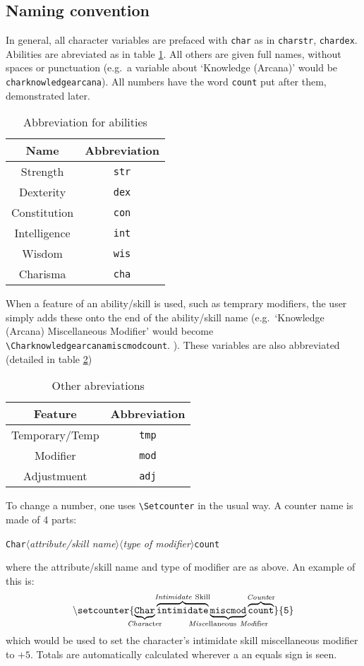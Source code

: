 \documentclass[oneside]{article}
\begin{document}
\subsection{Naming convention}
\label{sec:naming-convention}

In general, all character variables are prefaced with \verb=char= as in \verb=charstr=, \verb=chardex=. Abilities are abreviated as in table \ref{tab:abbrev}. All others are given full names, without spaces or punctuation (e.g.\ a variable about `Knowledge (Arcana)' would be \verb=charknowledgearcana=). All numbers have the word \verb=count= put after them, demonstrated later.

\begin{table}[h]
  \centering
  \begin{tabular}{c c }
    Name & Abbreviation\\\hline
    Strength & \verb=str=\\
    Dexterity & \verb=dex=\\
    Constitution & \verb=con=\\
    Intelligence & \verb=int=\\
    Wisdom & \verb=wis=\\
    Charisma & \verb=cha=\\\hline
  \end{tabular}
  \caption{Abbreviation for abilities}
  \label{tab:abbrev}
\end{table}

When a feature of an ability/skill is used, such as temprary modifiers, the user simply adds these onto the end of the ability/skill name (e.g.\ `Knowledge (Arcana) Miscellaneous Modifier' would become \verb=\Charknowledgearcanamiscmodcount=. ). These variables are also abbreviated (detailed in table \ref{tab:otherabbrev})

\begin{table}[h]
  \centering
  \begin{tabular}{c c }
    Feature & Abbreviation \\\hline
    Temporary/Temp & \verb=tmp=\\
    Modifier & \verb=mod=\\
    Adjustmuent & \verb=adj=\\\hline
  \end{tabular}
  \caption{Other abreviations}
  \label{tab:otherabbrev}
\end{table}

To change a number, one uses \verb=\Setcounter= in the usual way. A counter name is made of 4 parts:
\protect\parbox{\linewidth}{\texttt{Char}$\langle$\emph{attribute/skill name}$\rangle\langle$\emph{type of modifier}$\rangle$\texttt{count}}
where the attribute/skill name and type of modifier are as above. An example of this is:
\[
\mathtt{\backslash setcounter\{\underbrace{\mathtt{Char}}_{\mathclap{\mathrm{\emph{Char}acter}}}\overbrace{\mathtt{intimidate}}^{\mathclap{\mathrm{\emph{Intimidate}\ Skill}}}\underbrace{\mathtt{miscmod}}_{\mathclap{\mathrm{\emph{Misc}ellaneous\ \emph{Mod}ifier}}}\overbrace{\mathtt{count}}^{\mathclap{\mathrm{\emph{Count}er}}}\}\{5\}}
\]
which would be used to set the character's intimidate skill miscellaneous modifier to $+5$. Totals are automatically calculated wherever a an equals sign is seen.
\end{document}
